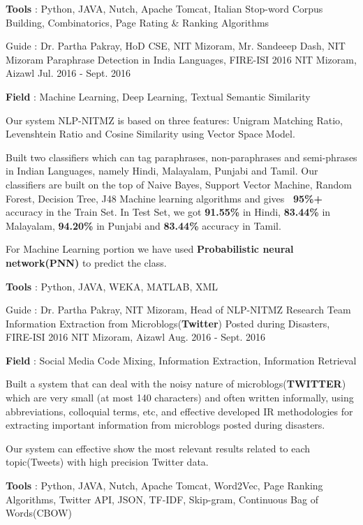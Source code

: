 \begin{cventries}
{\begin{cvitems}
        \item{\textbf{Tools} : Python, JAVA, Nutch, Apache Tomcat, Italian Stop-word Corpus Building, Combinatorics, Page Rating \& Ranking Algorithms}
      \end{cvitems} 
    }
  \cventry
    {Guide : Dr. Partha Pakray, HoD CSE, NIT Mizoram, Mr. Sandeeep Dash, NIT Mizoram}
    {Paraphrase Detection in India Languages, FIRE-ISI 2016}
    {NIT Mizoram, Aizawl}
    {Jul. 2016 - Sept. 2016}
    {
      \begin{cvitems}
      \item{\textbf{Field} : Machine Learning, Deep Learning, Textual Semantic Similarity}
        \item {Our system  NLP-NITMZ is based on three features: Unigram Matching Ratio, Levenshtein Ratio and Cosine Similarity using Vector Space Model.}
        \item {Built two classifiers which can tag paraphrases, non-paraphrases and semi-phrases in Indian Languages,
namely Hindi, Malayalam, Punjabi and Tamil. Our classifiers are built on the top of Naive Bayes, Support Vector Machine,
Random Forest, Decision Tree, J48 Machine learning algorithms and gives \textbf{~95\%+} accuracy in the Train Set. In Test Set, we got \textbf{91.55\%} in Hindi, \textbf{83.44\%} in Malayalam, \textbf{94.20\%} in Punjabi and \textbf{83.44\%} accuracy in Tamil.}
    \item{For Machine Learning portion we have used \textbf{Probabilistic neural network(PNN)} to predict the class.}
    \item{\textbf{Tools} : Python, JAVA, WEKA, MATLAB, XML}
      \end{cvitems}
    }
  \cventry
    {Guide : Dr. Partha Pakray, NIT Mizoram, Head of NLP-NITMZ Research Team}
    {Information Extraction from Microblogs(\textbf{Twitter}) Posted during Disasters, FIRE-ISI 2016}
    {NIT Mizoram, Aizawl}
    {Aug. 2016 - Sept. 2016}
    {
      \begin{cvitems}
        \item{\textbf{Field} : Social Media Code Mixing, Information Extraction, Information Retrieval}
        \item{Built a system that can deal with the noisy nature of microblogs(\textbf{TWITTER}) which are very small (at most 140 characters) and often written informally, using abbreviations, colloquial terms, etc, and 
effective developed IR methodologies for extracting important information from microblogs posted during disasters.}
        \item{Our system can effective show the most relevant results related to each topic(Tweets) with high precision Twitter data.}
        \item{\textbf{Tools} : Python, JAVA, Nutch, Apache Tomcat, Word2Vec, Page Ranking Algorithms, Twitter API, JSON, TF-IDF, Skip-gram, Continuous Bag of Words(CBOW)}
      \end{cvitems} 
    }
\end{cventries}  

